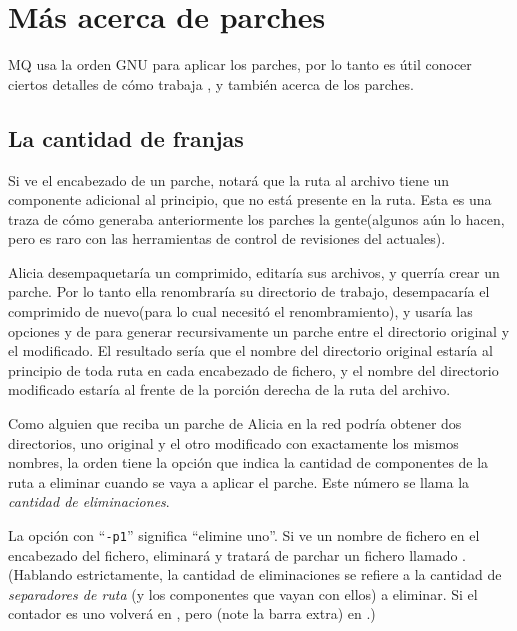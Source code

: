 \section{Más acerca de parches}
\label{sec:mq:adv-patch}

MQ usa la orden GNU  para aplicar los parches, por lo
tanto es útil conocer ciertos detalles de cómo trabaja
, y también acerca de los parches.

\subsection{La cantidad de franjas}

Si ve el encabezado de un parche, notará que la ruta al archivo tiene
un componente adicional al principio, que no está presente en la
ruta. Esta es una traza de cómo generaba anteriormente los parches la
gente(algunos aún lo hacen, pero es raro con las herramientas de
control de revisiones del actuales).

Alicia desempaquetaría un comprimido, editaría sus archivos, y querría
crear un parche.  Por lo tanto ella renombraría su directorio de
trabajo, desempacaría el comprimido de nuevo(para lo cual necesitó el
renombramiento), y usaría las opciones  y
 de  para generar recursivamente un
parche entre el directorio original y el modificado.  El resultado
sería que el nombre del directorio original estaría al principio de
toda ruta en cada encabezado de fichero, y el nombre del directorio
modificado estaría al frente de la porción derecha de la ruta del
archivo.

Como alguien que reciba un parche de Alicia en la red podría obtener
dos directorios, uno original y el otro modificado con exactamente los
mismos nombres, la orden  tiene la opción
 que indica la cantidad de componentes de la ruta
a eliminar cuando se vaya a aplicar el parche.  Este número se
llama la \emph{cantidad de eliminaciones}.

La opción con ``\texttt{-p1}'' significa ``elimine uno''.  Si
 ve un nombre de fichero  en el
encabezado del fichero, eliminará  y tratará de parchar
un fichero llamado .  (Hablando estrictamente, la
cantidad de eliminaciones se refiere a la cantidad de \emph{separadores de
 ruta} (y los componentes que vayan con ellos) a eliminar.  Si el
contador es uno volverá  en , pero
 (note la barra extra) en .)

